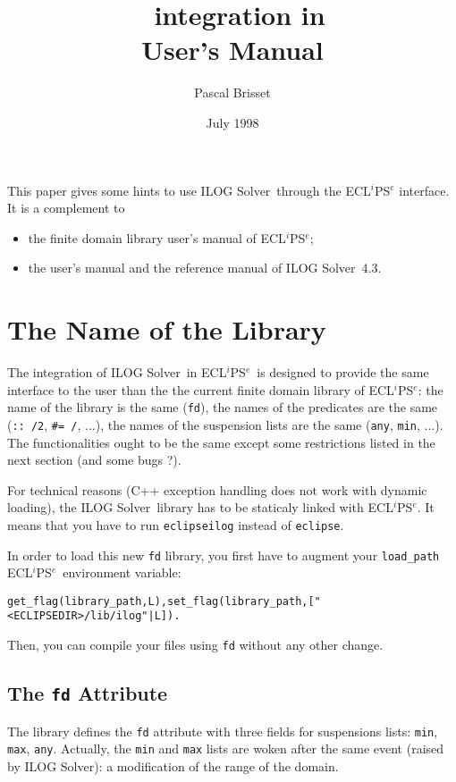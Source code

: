 \documentclass{article}
\title{\solver\ integration in \eclipse\\ User's Manual}
\author{Pascal \sc Brisset}
\date{July 1998}
\newcommand{\solver}{ILOG Solver}
\newcommand{\eclipse}{ECL$^i$PS$^e$}
\begin{document}
\maketitle

This paper gives some hints to use \solver\ through the \eclipse
interface. It is a complement to 
\begin{itemize}
 \item the finite domain library user's manual of \eclipse;
 \item the user's manual and the reference manual of \solver~4.3.
\end{itemize}


\section{The Name of the Library}

The integration of \solver\ in \eclipse\ is designed to provide the same
interface to the user than the the current finite domain library of \eclipse:
the name of the library is the same (\verb"fd"), the names of the predicates
are the same (\verb":: /2", \verb"#= /", ...), the names of the suspension
lists are the same (\verb"any", \verb"min", ...). The functionalities ought to
be the same except some restrictions listed in the next section (and some
bugs ?).

For technical reasons (C++ exception handling does not work with dynamic
loading), the \solver\ library has to be staticaly linked with \eclipse. It
means that you have to run \verb"eclipseilog" instead of \verb"eclipse".

In order to load this new \verb"fd" library, you first have to augment your
\verb"load_path" \eclipse\ environment variable:
\begin{verbatim}
get_flag(library_path,L),set_flag(library_path,["<ECLIPSEDIR>/lib/ilog"|L]).
\end{verbatim}
Then, you can compile your files using \verb"fd" without any other change.

\subsection{The {\tt fd} Attribute}

The library defines the \verb"fd" attribute with three fields for suspensions
lists: \verb"min", \verb"max", \verb"any". Actually, the \verb"min" and
\verb"max" lists are woken after the same event (raised by \solver): a
modification of the range of the domain.
\end{document}
